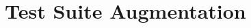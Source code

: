 




\clearpage
\section{Test Suite Augmentation} %
\label{sec:data:test_suite_augmentation}


%
%
%
%
%
%
%
%


